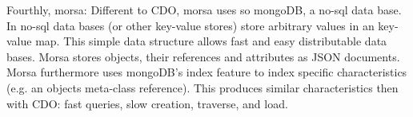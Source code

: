 Fourthly, morsa: Different to CDO, morsa uses so mongoDB, a no-sql data base. In no-sql data bases (or other key-value stores) store arbitrary values in an key-value map. This simple data structure allows fast and easy distributable data bases. Morsa stores objects, their references and attributes as JSON documents. Morsa furthermore uses mongoDB's index feature to index specific characteristics (e.g. an objects meta-class reference). This produces similar characteristics then with CDO: fast queries, slow creation, traverse, and load.
 
